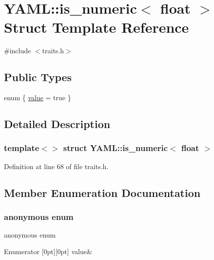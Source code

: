\hypertarget{struct_y_a_m_l_1_1is__numeric_3_01float_01_4}{}\section{Y\+A\+ML\+::is\+\_\+numeric$<$ float $>$ Struct Template Reference}
\label{struct_y_a_m_l_1_1is__numeric_3_01float_01_4}


{\ttfamily \#include $<$traits.\+h$>$}

\subsection*{Public Types}
\begin{DoxyCompactItemize}
\item 
enum \{ \mbox{\hyperlink{struct_y_a_m_l_1_1is__numeric_3_01float_01_4_aa9cd0d95ca8d5615a30d41c7fc285227a5aa01ba622cc988073b96679c28f997f}{value}} = true
 \}
\end{DoxyCompactItemize}


\subsection{Detailed Description}
\subsubsection*{template$<$$>$\newline
struct Y\+A\+M\+L\+::is\+\_\+numeric$<$ float $>$}



Definition at line 68 of file traits.\+h.



\subsection{Member Enumeration Documentation}
\mbox{\label{struct_y_a_m_l_1_1is__numeric_3_01float_01_4_aa9cd0d95ca8d5615a30d41c7fc285227}} 
\subsubsection{\texorpdfstring{anonymous enum}{anonymous enum}}
{\footnotesize\ttfamily anonymous enum}

\begin{DoxyEnumFields}{Enumerator}
[0pt][0pt]{}\mbox{\label{struct_y_a_m_l_1_1is__numeric_3_01float_01_4_aa9cd0d95ca8d5615a30d41c7fc285227a5aa01ba622cc988073b96679c28f997f}} 
value&\\
\hline

\end{DoxyEnumFields}



